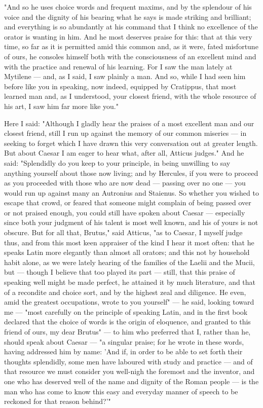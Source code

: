  "And so he uses choice words and frequent maxims, and by the splendour of his voice and the dignity of his bearing what he says is made striking and brilliant; and everything is so abundantly at his command that I think no excellence of the orator is wanting in him. And he most deserves praise for this: that at this very time, so far as it is permitted amid this common and, as it were, fated misfortune of ours, he consoles himself both with the consciousness of an excellent mind and with the practice and renewal of his learning. For I saw the man lately at Mytilene — and, as I said, I saw plainly a man. And so, while I had seen him before like you in speaking, now indeed, equipped by Cratippus, that most learned man and, as I understood, your closest friend, with the whole resource of his art, I saw him far more like you."

 Here I said: "Although I gladly hear the praises of a most excellent man and our closest friend, still I run up against the memory of our common miseries — in seeking to forget which I have drawn this very conversation out at greater length. But about Caesar I am eager to hear what, after all, Atticus judges." And he said: "Splendidly do you keep to your principle, in being unwilling to say anything yourself about those now living; and by Hercules, if you were to proceed as you proceeded with those who are now dead — passing over no one — you would run up against many an Autronius and Staienus. So whether you wished to escape that crowd, or feared that someone might complain of being passed over or not praised enough, you could still have spoken about Caesar — especially since both your judgment of his talent is most well known, and his of yours is not obscure. But for all that, Brutus," said Atticus, "as to Caesar, I myself judge thus, and from this most keen appraiser of the kind I hear it most often: that he speaks Latin more elegantly than almost all orators; and this not by household habit alone, as we were lately hearing of the families of the Laelii and the Mucii, but — though I believe that too played its part — still, that this praise of speaking well might be made perfect, he attained it by much literature, and that of a recondite and choice sort, and by the highest zeal and diligence. He even, amid the greatest occupations, wrote to you yourself" — he said, looking toward me — "most carefully on the principle of speaking Latin, and in the first book declared that the choice of words is the origin of eloquence, and granted to this friend of ours, my dear Brutus" — to him who preferred that I, rather than he, should speak about Caesar — "a singular praise; for he wrote in these words, having addressed him by name: 'And if, in order to be able to set forth their thoughts splendidly, some men have laboured with study and practice — and of that resource we must consider you well-nigh the foremost and the inventor, and one who has deserved well of the name and dignity of the Roman people — is the man who has come to know this easy and everyday manner of speech to be reckoned for that reason behind?'"

